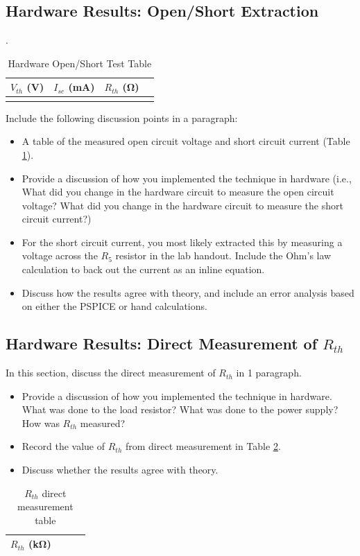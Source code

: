 \documentclass[11pt]{article}
\begin{document}
  \subsection{Hardware Results: Open/Short Extraction}
  
  \begin{table}[h!]
  	\centering
  	\caption{Hardware Open/Short Test Table}.
  	\label{Table:Lab3VocIsc}
  	\begin{tabular}{|c|c|c|c|}
  		\hline
  		$V_{th}$ (\si{\volt})& $I_{sc}$ (\si{\milli\ampere}) & $R_{th}$ (\si{\ohm}) \\
  		\hline
  		& &  \\	 \hline 
  	\end{tabular}
  \end{table}
  Include the following discussion points in a paragraph:
  \begin{itemize}
  	\item A table of the measured open circuit voltage and short circuit current  (Table \ref{Table:Lab3VocIsc}).
  	\item Provide a discussion of how you implemented the technique in hardware (i.e., What did you change in the hardware circuit to measure the open circuit voltage?  What did you change in the hardware circuit to measure the short circuit current?)
  	\item For the short circuit current, you most likely extracted this by measuring a voltage across the $R_5$ resistor in the lab handout.  Include the Ohm's law calculation to back out the current as an inline equation. 
  	\item Discuss how the results agree with theory, and include an error analysis based on either the PSPICE or hand calculations.
  \end{itemize}
  \subsection{Hardware Results: Direct Measurement of $R_{th}$}
  In this section, discuss the  direct measurement of $R_{th}$ in  1 paragraph.
  \begin{itemize}
  	\item Provide a discussion of how you implemented the technique in hardware.  What was done to the load resistor? What was done to the power supply?  How was $R_{th}$ measured?
  	\item Record the value of $R_{th}$ from direct measurement in Table \ref{Table:Lab3RthDirect}.
  	\item Discuss whether the results agree with theory.
  \end{itemize}
  \begin{table}[h!]
  	\centering
  	\caption{$R_{th}$ direct measurement table}
  	\label{Table:Lab3RthDirect}
  	\begin{tabular}{|c|c|c|c|}
  		\hline
  		$R_{th}$ (\si{\kilo\ohm})&\hspace{2in} \\
  		\hline 
  	\end{tabular}
  \end{table}
\end{document}
